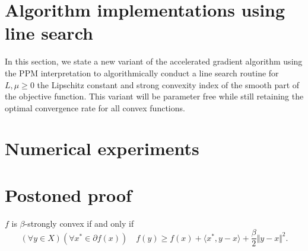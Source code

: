 \documentclass[12pt]{article}
\begin{document}
            


\section{Algorithm implementations using line search}\label{sec:algorithm_improved}
    In this section, we state a new variant of the accelerated gradient algorithm using the PPM interpretation to algorithmically conduct a line search routine for $L, \mu \ge 0$ the Lipschitz constant and strong convexity index of the smooth part of the objective function. 
    This variant will be parameter free while still retaining the optimal convergence rate for all convex functions. 
    

\section{Numerical experiments}\label{sec:numerical_experiments}

\appendix

\section{Postoned proof}
    \begin{fact}
    \label{appendix:fact:equiv_char_s-cvx}
        $f$ is $\beta$-strongly convex if and only if
        $$
            (\forall y\in X)(\forall x^* \in \partial f(x))
            \quad f(y) \ge f(x) + \langle x^*, y - x\rangle +
            \frac{\beta}{2}\Vert y - x\Vert^2
            .
        $$
    \end{fact}
\end{document}
